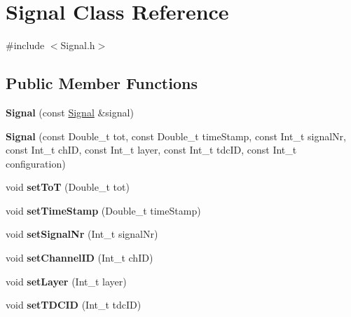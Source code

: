 \hypertarget{classSignal}{}\section{Signal Class Reference}
\label{classSignal}


{\ttfamily \#include $<$Signal.\+h$>$}

\subsection*{Public Member Functions}
\begin{DoxyCompactItemize}
\item 
\mbox{\label{classSignal_aacd1c1db116fa64590cbd616bbb9b99e}} 
{\bfseries Signal} (const \hyperlink{classSignal}{Signal} \&signal)
\item 
\mbox{\label{classSignal_a2d1f4386cae0656644304af723bc9e6d}} 
{\bfseries Signal} (const Double\+\_\+t tot, const Double\+\_\+t time\+Stamp, const Int\+\_\+t signal\+Nr, const Int\+\_\+t ch\+ID, const Int\+\_\+t layer, const Int\+\_\+t tdc\+ID, const Int\+\_\+t configuration)
\item 
\mbox{\label{classSignal_a0eab44b80f06fe137380bb9019bc1d0b}} 
void {\bfseries set\+ToT} (Double\+\_\+t tot)
\item 
\mbox{\label{classSignal_a1d05ab45905ecdbcd1b805772201bb44}} 
void {\bfseries set\+Time\+Stamp} (Double\+\_\+t time\+Stamp)
\item 
\mbox{\label{classSignal_a2fd6315f9401e80260208865f18908ed}} 
void {\bfseries set\+Signal\+Nr} (Int\+\_\+t signal\+Nr)
\item 
\mbox{\label{classSignal_a9a6644e15b31e69dd058051f43fbdf4f}} 
void {\bfseries set\+Channel\+ID} (Int\+\_\+t ch\+ID)
\item 
\mbox{\label{classSignal_a40d6655c03d431f75bc278494fd239af}} 
void {\bfseries set\+Layer} (Int\+\_\+t layer)
\item 
\mbox{\label{classSignal_a6dbea111d27c3654ad801eb1604561fc}} 
void {\bfseries set\+T\+D\+C\+ID} (Int\+\_\+t tdc\+ID)
\item 

\end{DoxyCompactItemize}
